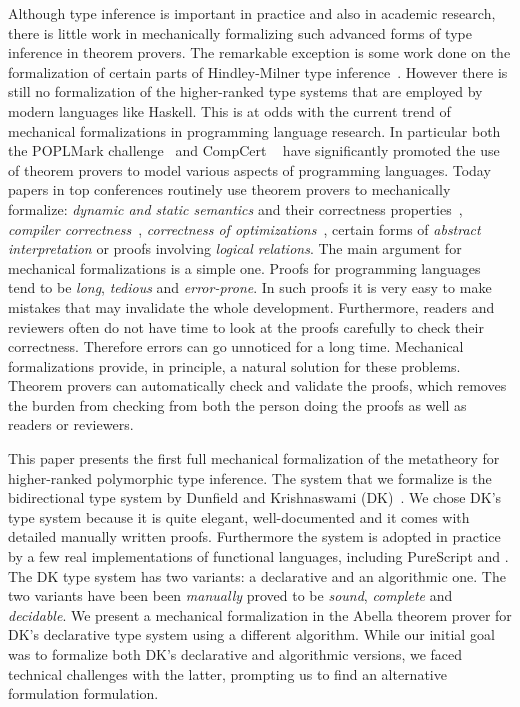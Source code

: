 Although type inference is important in practice and also in
academic research, there is little work in mechanically formalizing
such advanced forms of type inference in theorem provers.
The remarkable exception is some work done on the formalization of 
certain parts of Hindley-Milner type inference~\cite{naraschewski1999type,
dubois2000proving,dubois1999certification,urban2008nominal,
garrigue2015certified}. However
there is still no formalization of the higher-ranked type systems
that are employed by modern languages like Haskell.
This is at
odds with the current trend of mechanical formalizations in
programming language research. In particular both the POPLMark
challenge~\cite{aydemir2005mechanized} and
CompCert ~\cite{leroy2012compcert} have significantly promoted
the use of theorem provers to model various aspects of programming
languages. Today papers in top conferences routinely
use theorem provers to mechanically formalize: \emph{dynamic and
  static semantics} and their correctness properties~\cite{},
\emph{compiler correctness}~\cite{}, \emph{correctness of
  optimizations}~\cite{}, certain forms of \emph{abstract
  interpretation} or proofs involving \emph{logical relations}. The
main argument for mechanical formalizations is a simple one. Proofs
for programming languages tend to be \emph{long}, \emph{tedious} and
\emph{error-prone}. In such proofs it is very easy to make mistakes
that may invalidate the whole development. Furthermore, readers and
reviewers often do not have time to look at the proofs carefully to
check their correctness. Therefore errors can go unnoticed for a
long time.  Mechanical formalizations provide, in principle, a natural
solution for these problems. Theorem provers can automatically check and
validate the proofs, which removes the burden from checking from both
the person doing the proofs as well as readers or reviewers.

This paper presents the first full mechanical formalization of the
metatheory for higher-ranked polymorphic type inference.
The system
that we formalize is the bidirectional type system by Dunfield and
Krishnaswami (DK)~\cite{dunfield2013complete}.
We chose DK's type system because it is
quite elegant, well-documented and it comes with detailed manually
written proofs. Furthermore the system is adopted in practice by a few
real implementations of functional languages, including PureScript and
.  The DK type system has two variants: a declarative
and an algorithmic one. The two variants have been been
\emph{manually} proved to be \emph{sound}, \emph{complete} and
\emph{decidable}.
We present a mechanical formalization in the Abella theorem prover for
DK's declarative type system using a different algorithm. While our
initial goal was to formalize both DK's declarative and algorithmic
versions, we faced technical challenges with the latter, prompting us to find
an alternative formulation formulation.

